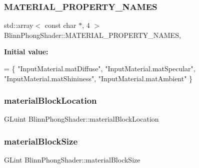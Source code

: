 \subsubsection{\texorpdfstring{M\+A\+T\+E\+R\+I\+A\+L\+\_\+\+P\+R\+O\+P\+E\+R\+T\+Y\+\_\+\+N\+A\+M\+ES}{MATERIAL\_PROPERTY\_NAMES}}
{\footnotesize\ttfamily std\+::array$<$ const char $\ast$, 4 $>$ Blinn\+Phong\+Shader\+::\+M\+A\+T\+E\+R\+I\+A\+L\+\_\+\+P\+R\+O\+P\+E\+R\+T\+Y\+\_\+\+N\+A\+M\+ES\hspace{0.3cm}{\ttfamily [static]}, {\ttfamily [protected]}}

{\bfseries Initial value\+:}
\begin{DoxyCode}
= \{
    \textcolor{stringliteral}{"InputMaterial.matDiffuse"}, 
    \textcolor{stringliteral}{"InputMaterial.matSpecular"}, 
    \textcolor{stringliteral}{"InputMaterial.matShininess"}, 
    \textcolor{stringliteral}{"InputMaterial.matAmbient"}
\}
\end{DoxyCode}
\hypertarget{class_blinn_phong_shader_a4dcd123c2284945734df697501dca5ea}{}\label{class_blinn_phong_shader_a4dcd123c2284945734df697501dca5ea} 
\subsubsection{\texorpdfstring{material\+Block\+Location}{materialBlockLocation}}
{\footnotesize\ttfamily G\+Luint Blinn\+Phong\+Shader\+::material\+Block\+Location\hspace{0.3cm}{\ttfamily [protected]}}

\hypertarget{class_blinn_phong_shader_af38b3d042773f6568f0f6c227de85990}{}\label{class_blinn_phong_shader_af38b3d042773f6568f0f6c227de85990} 
\subsubsection{\texorpdfstring{material\+Block\+Size}{materialBlockSize}}
{\footnotesize\ttfamily G\+Lint Blinn\+Phong\+Shader\+::material\+Block\+Size\hspace{0.3cm}{\ttfamily [protected]}}

\hypertarget{class_blinn_phong_shader_a85dbf4a8376a98570a06d9df17938cf4}{}\label{class_blinn_phong_shader_a85dbf4a8376a98570a06d9df17938cf4} 
